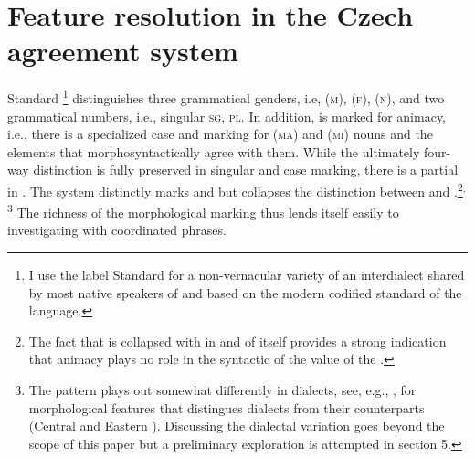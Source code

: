\documentclass[output=paper,modfontsnewtxmath,hidelinks]{langscibook}
\begin{document}
\section{Feature resolution in the Czech agreement system}
\label{sec:featureResolution}

Standard \footnote{I use the label Standard  for a non-vernacular variety of an interdialect shared by most native speakers of  and based on the modern codified standard of the  language.} distinguishes three grammatical genders, i.e,  (\textsc{m}),  (\textsc{f}),  (\textsc{n}), and two grammatical numbers, i.e., singular \textsc{sg},  \textsc{pl}. In addition,   is marked for animacy, i.e., there is a specialized case and  marking for  (\textsc{ma}) and  (\textsc{mi})  nouns and the elements that morphosyntactically agree with them. While the ultimately four-way distinction is fully preserved in singular  and case marking, there is a partial  in . The system distinctly marks   and    but collapses the distinction between   and .\footnote{The fact that  is collapsed with   in and of itself provides a strong indication that animacy plays no role in the syntactic  of the  value of the .}$^,$\footnote{The  pattern plays out somewhat differently in dialects, see, e.g., \citet[392--404]{KarlikEtAl:2002}, for morphological features that distingues  dialects from their  counterparts (Central and Eastern ). Discussing the dialectal variation goes beyond the scope of this paper but a preliminary exploration is attempted in section 5.} The richness of the morphological marking thus lends itself easily to investigating  with coordinated  phrases.
\end{document}
